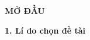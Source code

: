 \newpage
{}
\begin{center}
\textbf{\textbf {MỞ ĐẦU}}
\end{center}
\noindent \textbf{1. Lí do chọn đề tài}

